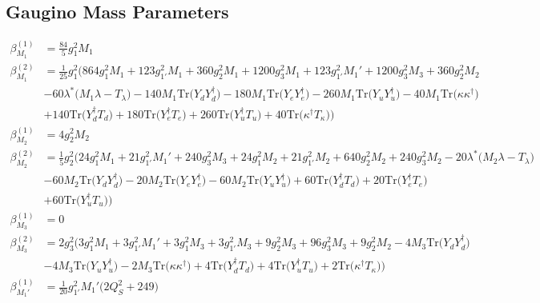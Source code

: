 \subsection{Gaugino Mass Parameters}
{\allowdisplaybreaks  \begin{align} 
\beta_{M_1}^{(1)} & =  
\frac{84}{5} g_{1}^{2} M_1 \\ 
\beta_{M_1}^{(2)} & =  
\frac{1}{25} g_{1}^{2} \Big(864 g_{1}^{2} M_1 +123 g_{1'}^{2} M_1 +360 g_{2}^{2} M_1 +1200 g_{3}^{2} M_1 +123 g_{1'}^{2} M_1' +1200 g_{3}^{2} M_3 +360 g_{2}^{2} M_2 \nonumber \\ 
 &-60 \lambda^* \Big(M_1 \lambda  - T_{\lambda} \Big)-140 M_1 \mbox{Tr}\Big({Y_d  Y_{d}^{\dagger}}\Big) -180 M_1 \mbox{Tr}\Big({Y_e  Y_{e}^{\dagger}}\Big) -260 M_1 \mbox{Tr}\Big({Y_u  Y_{u}^{\dagger}}\Big) -40 M_1 \mbox{Tr}\Big({\kappa  \kappa^{\dagger}}\Big) \nonumber \\ 
 &+140 \mbox{Tr}\Big({Y_{d}^{\dagger}  T_d}\Big) +180 \mbox{Tr}\Big({Y_{e}^{\dagger}  T_e}\Big) +260 \mbox{Tr}\Big({Y_{u}^{\dagger}  T_u}\Big) +40 \mbox{Tr}\Big({\kappa^{\dagger}  T_{\kappa}}\Big) \Big)\\ 
\beta_{M_2}^{(1)} & =  
4 g_{2}^{2} M_2 \\ 
\beta_{M_2}^{(2)} & =  
\frac{1}{5} g_{2}^{2} \Big(24 g_{1}^{2} M_1 +21 g_{1'}^{2} M_1' +240 g_{3}^{2} M_3 +24 g_{1}^{2} M_2 +21 g_{1'}^{2} M_2 +640 g_{2}^{2} M_2 +240 g_{3}^{2} M_2 -20 \lambda^* \Big(M_2 \lambda  - T_{\lambda} \Big)\nonumber \\ 
 &-60 M_2 \mbox{Tr}\Big({Y_d  Y_{d}^{\dagger}}\Big) -20 M_2 \mbox{Tr}\Big({Y_e  Y_{e}^{\dagger}}\Big) -60 M_2 \mbox{Tr}\Big({Y_u  Y_{u}^{\dagger}}\Big) +60 \mbox{Tr}\Big({Y_{d}^{\dagger}  T_d}\Big) +20 \mbox{Tr}\Big({Y_{e}^{\dagger}  T_e}\Big) \nonumber \\ 
 &+60 \mbox{Tr}\Big({Y_{u}^{\dagger}  T_u}\Big) \Big)\\ 
\beta_{M_3}^{(1)} & =  
0\\ 
\beta_{M_3}^{(2)} & =  
2 g_{3}^{2} \Big(3 g_{1}^{2} M_1 +3 g_{1'}^{2} M_1' +3 g_{1}^{2} M_3 +3 g_{1'}^{2} M_3 +9 g_{2}^{2} M_3 +96 g_{3}^{2} M_3 +9 g_{2}^{2} M_2 -4 M_3 \mbox{Tr}\Big({Y_d  Y_{d}^{\dagger}}\Big) \nonumber \\ 
 &-4 M_3 \mbox{Tr}\Big({Y_u  Y_{u}^{\dagger}}\Big) -2 M_3 \mbox{Tr}\Big({\kappa  \kappa^{\dagger}}\Big) +4 \mbox{Tr}\Big({Y_{d}^{\dagger}  T_d}\Big) +4 \mbox{Tr}\Big({Y_{u}^{\dagger}  T_u}\Big) +2 \mbox{Tr}\Big({\kappa^{\dagger}  T_{\kappa}}\Big) \Big)\\ 
\beta_{M_1'}^{(1)} & =  
\frac{1}{20} g_{1'}^{2} M_1' \Big(2 Q_{S}^{2}  + 249\Big)\\ 

\end{align}}
